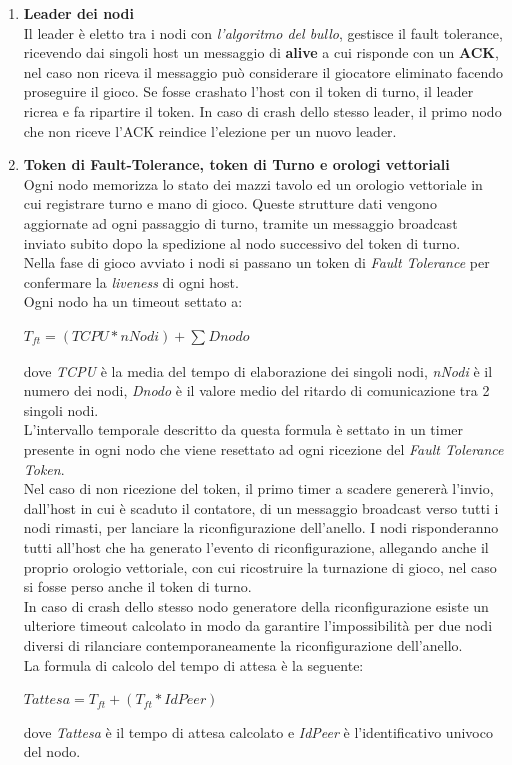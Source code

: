 \documentclass[10pt,a4paper]{article}
\begin{document}
\begin{enumerate}
\item \textbf{Leader dei nodi}\\ Il leader è eletto tra i nodi con \textit{l'algoritmo del bullo}, gestisce il fault tolerance, ricevendo dai singoli host un messaggio di \textbf{alive} a cui risponde con un \textbf{ACK}, nel caso non riceva il messaggio può considerare il giocatore eliminato facendo proseguire il gioco. Se fosse crashato l'host con il token di turno, il leader ricrea e fa ripartire il token. In caso di crash dello stesso leader, il primo nodo che non riceve l'ACK reindice l'elezione per un nuovo leader. 

\item \textbf{Token di Fault-Tolerance, token di Turno e orologi vettoriali}\\ Ogni nodo memorizza lo stato dei mazzi tavolo ed un orologio vettoriale in cui registrare turno e mano di gioco. Queste strutture dati vengono aggiornate ad ogni passaggio di turno, tramite un messaggio broadcast inviato subito dopo la spedizione al nodo successivo del token di turno.\\ Nella fase di gioco avviato i nodi si passano un token di \textit{Fault Tolerance} per confermare la \textit{liveness} di ogni host. \\ Ogni nodo ha un timeout settato a: \\\begin{center}$T_{ft} = (TCPU*nNodi)+\sum_{}Dnodo$\end{center} dove \textit{TCPU} è la media del tempo di elaborazione dei singoli nodi, \textit{nNodi} è il numero dei nodi, \textit{Dnodo} è il valore medio del ritardo di comunicazione tra 2 singoli nodi.\\L'intervallo temporale descritto da questa formula è settato in un timer presente in ogni nodo che viene resettato ad ogni ricezione del \textit{Fault Tolerance Token}.\\ Nel caso di non ricezione del token, il primo timer a scadere genererà l'invio, dall'host in cui è scaduto il contatore, di un messaggio broadcast verso tutti i nodi rimasti, per lanciare la riconfigurazione dell'anello. I nodi risponderanno tutti all'host che ha generato l'evento di riconfigurazione, allegando anche il proprio orologio vettoriale, con cui ricostruire la turnazione di gioco, nel caso si fosse perso anche il token di turno. \\ In caso di crash dello stesso nodo generatore della riconfigurazione esiste un ulteriore timeout calcolato in modo da garantire l'impossibilità per due nodi diversi di rilanciare contemporaneamente la riconfigurazione dell'anello.\\ La formula di calcolo del tempo di attesa è la seguente:\begin{center}$Tattesa = T_{ft} +(T_{ft} * IdPeer)$\end{center}dove \textit{Tattesa} è il tempo di attesa calcolato e \textit{IdPeer} è l'identificativo univoco del nodo.\end{enumerate}
\end{document}

